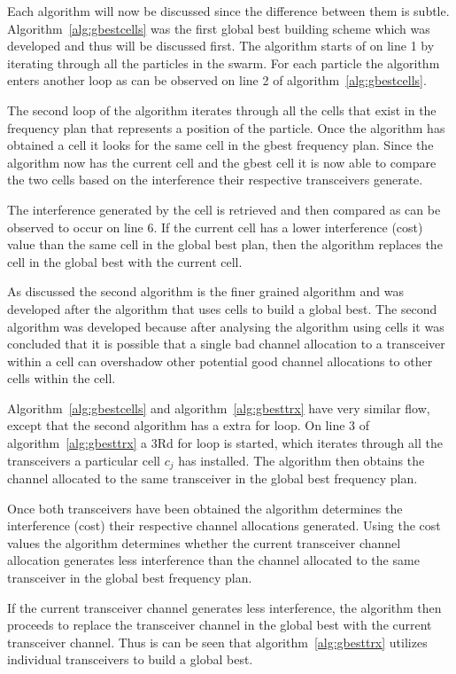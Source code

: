 Each algorithm will now be discussed since the difference between them is subtle. Algorithm~\ref{alg:gbestcells} was the first global best building scheme which was developed and thus will be discussed first. The algorithm starts of on line 1 by iterating through all the particles in the swarm. For each particle the algorithm enters another loop as can be observed on line 2 of algorithm~\ref{alg:gbestcells}.

The second loop of the algorithm iterates through all the cells that exist in the frequency plan that represents a position of the particle. Once the algorithm has obtained a cell it looks for the same cell in the gbest frequency plan. Since the algorithm now has the current cell and the gbest cell it is now able to compare the two cells based on the interference their respective transceivers generate.

The interference generated by the cell is retrieved and then compared as can be observed to occur on line 6. If the current cell has a lower interference (cost) value than the same cell in the global best plan, then the algorithm replaces the cell in the global best with the current cell.

As discussed the second algorithm is the finer grained algorithm and was developed after the algorithm that uses cells to build a global best. The second algorithm was developed because after analysing the algorithm using cells it was concluded that it is possible that a single bad channel allocation to a transceiver within a cell can overshadow other potential good channel allocations to other cells within the cell.

Algorithm~\ref{alg:gbestcells} and algorithm~\ref{alg:gbesttrx} have very similar flow, except that the second algorithm has a extra for loop. On line 3 of algorithm~\ref{alg:gbesttrx} a 3Rd for loop is started, which iterates through all the transceivers a particular cell $c_j$ has installed. The algorithm then obtains the channel allocated to the same transceiver in the global best frequency plan.

Once both transceivers have been obtained the algorithm determines the interference (cost) their respective channel allocations generated. Using the cost values the algorithm determines whether the current transceiver channel allocation generates less interference than the channel allocated to the same transceiver in the global best frequency plan.

If the current transceiver channel generates less interference, the algorithm then proceeds to replace the transceiver channel in the global best with the current transceiver channel. Thus is can be seen that algorithm~\ref{alg:gbesttrx} utilizes individual transceivers to build a global best.

